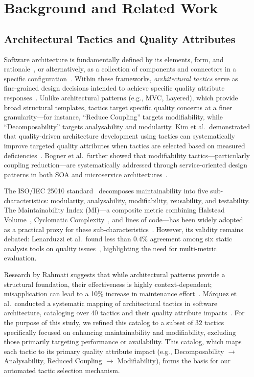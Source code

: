 \documentclass[sigconf,review,anonymous]{acmart}
\begin{document}
\section{Background and Related Work}

\subsection{Architectural Tactics and Quality Attributes}
Software architecture is fundamentally defined by its elements, form, and rationale~\cite{perry1992foundations}, or alternatively, as a collection of components and connectors in a specific configuration~\cite{garlan1993introduction}. Within these frameworks, \textit{architectural tactics} serve as fine-grained design decisions intended to achieve specific quality attribute responses~\cite{bass2021software}. Unlike architectural patterns (e.g., MVC, Layered), which provide broad structural templates, tactics target specific quality concerns at a finer granularity---for instance, ``Reduce Coupling'' targets modifiability, while ``Decomposability'' targets analysability and modularity. Kim et al.\ demonstrated that quality-driven architecture development using tactics can systematically improve targeted quality attributes when tactics are selected based on measured deficiencies~\cite{kim2009qualitydriven}. Bogner et al.\ further showed that modifiability tactics---particularly coupling reduction---are systematically addressed through service-oriented design patterns in both SOA and microservice architectures~\cite{bogner2019modifiability}.

The ISO/IEC 25010 standard~\cite{ISO25010} decomposes maintainability into five sub-characteristics: modularity, analysability, modifiability, reusability, and testability. The Maintainability Index (MI)---a composite metric combining Halstead Volume~\cite{halstead1977elements}, Cyclomatic Complexity~\cite{mccabe1976complexity}, and lines of code---has been widely adopted as a practical proxy for these sub-characteristics~\cite{oman1992maintainability}. However, its validity remains debated: Lenarduzzi et al.\ found less than 0.4\% agreement among six static analysis tools on quality issues~\cite{lenarduzzi2023critical}, highlighting the need for multi-metric evaluation.

Research by Rahmati suggests that while architectural patterns provide a structural foundation, their effectiveness is highly context-dependent; misapplication can lead to a 10\% increase in maintenance effort~\cite{rahmati2021ensuring}. M\'arquez et al.\ conducted a systematic mapping of architectural tactics in software architecture, cataloging over 40 tactics and their quality attribute impacts~\cite{marquez2022architectural}. For the purpose of this study, we refined this catalog to a subset of 32 tactics specifically focused on enhancing maintainability and modifiability, excluding those primarily targeting performance or availability. This catalog, which maps each tactic to its primary quality attribute impact (e.g., Decomposability $\rightarrow$ Analysability, Reduced Coupling $\rightarrow$ Modifiability), forms the basis for our automated tactic selection mechanism.
\end{document}
